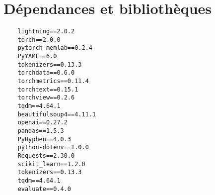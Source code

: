 \chapter{Dépendances et bibliothèques}%
\label{app.dependances}

\begin{center}
    \begin{verbatim}
    lightning==2.0.2
    torch==2.0.0
    pytorch_memlab==0.2.4
    PyYAML==6.0
    tokenizers==0.13.3
    torchdata==0.6.0
    torchmetrics==0.11.4
    torchtext==0.15.1
    torchview==0.2.6
    tqdm==4.64.1
    beautifulsoup4==4.11.1
    openai==0.27.2
    pandas==1.5.3
    PyHyphen==4.0.3
    python-dotenv==1.0.0
    Requests==2.30.0
    scikit_learn==1.2.0
    tokenizers==0.13.3
    tqdm==4.64.1
    evaluate==0.4.0
    \end{verbatim}
\end{center}